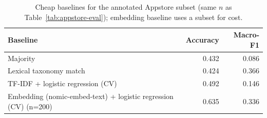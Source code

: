 \begin{table}[t]
\centering
\small
\caption{Cheap baselines for the annotated Appstore subset (same $n$ as Table~\ref{tab:appstore-eval}); embedding baseline uses a subset for cost.}
\label{tab:appstore-baselines}
\begin{tabular}{lrr}
\toprule
Baseline & Accuracy & Macro-F1 \\
\midrule
Majority & 0.432 & 0.086 \\
Lexical taxonomy match & 0.424 & 0.366 \\
TF-IDF + logistic regression (CV) & 0.492 & 0.146 \\
Embedding (nomic-embed-text) + logistic regression (CV) (n=200) & 0.635 & 0.336 \\
\bottomrule
\end{tabular}
\end{table}

